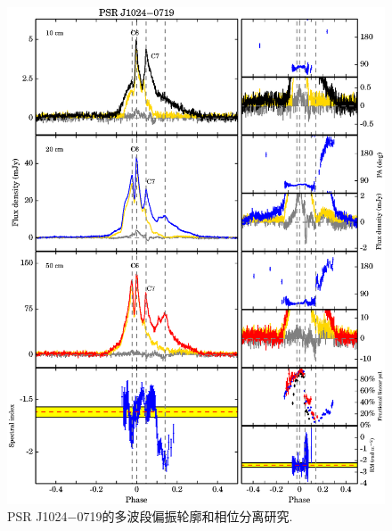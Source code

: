 \begin{figure}
\begin{center}
\includegraphics[width=6 in]{1024.ps}
\caption{PSR J1024$-$0719的多波段偏振轮廓和相位分离研究.}
\label{1024}
\end{center}
\end{figure}

